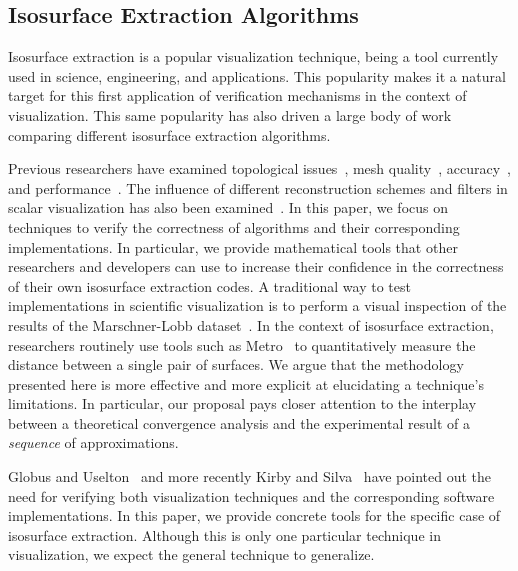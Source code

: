\subsection{Isosurface Extraction Algorithms}
\label{chap1:sec:prevwork}

Isosurface extraction is a popular visualization technique, being a
tool currently used in science, engineering, and applications.
This popularity makes it a natural target for this first application of
verification mechanisms in the context of visualization.
%
This same popularity has also driven a large body of work
comparing different isosurface extraction algorithms.

Previous researchers have examined topological 
issues~\cite{ning93, Lewiner:2003},
mesh quality~\cite{Dietrich:TVCG:2008,Schreiner06},
accuracy~\cite{patera04,zhou01}, and
performance~\cite{Sutton00acase}. The influence of different reconstruction schemes and 
filters in scalar visualization has also been examined~\cite{Hamish06,Pommert02}.
In this paper, we focus on techniques to verify the correctness of
algorithms and their corresponding implementations. In particular, we
provide mathematical tools that other researchers and developers can
use to increase their confidence in the correctness of their own
isosurface extraction codes.  A traditional way to test
implementations in scientific visualization is to perform a visual
inspection of the results of the Marschner-Lobb
dataset~\cite{marschnerlobb}. In the context of isosurface extraction,
researchers routinely use tools such as Metro~\cite{Cignoni:1998:MET} to
quantitatively measure the distance between a single pair of surfaces.
We argue that the methodology presented here is more effective and more
explicit at elucidating a technique's limitations. In particular, our proposal
pays closer attention to the interplay between a theoretical
convergence analysis and the experimental result of a \emph{sequence} of
approximations.

Globus and Uselton~\cite{globus95} and more recently
Kirby and Silva~\cite{kirby-vv-08} have pointed out the need 
for verifying both visualization techniques and the corresponding
software implementations. In this paper, we provide concrete tools for
the specific case of isosurface extraction. Although this is only one
particular technique in visualization, we expect the general technique
to generalize.


